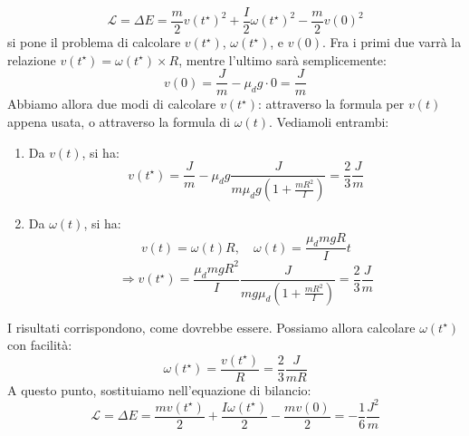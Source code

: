 \documentclass[a4paper,12pt]{article}
\begin{document}
\begin{itemize}
      $$ \mathcal{L} = \Delta E = \frac{m}{2}v(t^\star)^2 + \frac{I}{2}\omega(t^\star)^2 - \frac{m}{2}v(0)^2 $$
      si pone il problema di calcolare $v(t^\star)$, $\omega(t^\star)$, e $v(0)$. Fra i primi due varrà la relazione $v(t^\star) = \omega(t^\star) \times R$,
      mentre l'ultimo sarà semplicemente: 
      $$ v(0) = \frac{J}{m} - \mu_dg \cdot 0 = \frac{J}{m} $$
      Abbiamo allora due modi di calcolare $v(t^\star)$: attraverso la formula per $v(t)$ appena usata, o attraverso la formula di $\omega(t)$. Vediamoli entrambi:
      \begin{enumerate}
        \item Da $v(t)$, si ha:
          $$ v(t^\star) = \frac{J}{m} - \mu_dg \frac{J}{m\mu_dg\left( 1 + \frac{mR^2}{I} \right)} = \frac{2}{3}\frac{J}{m} $$
        \item Da $\omega(t)$, si ha:
          $$ v(t) = \omega(t)R, \quad \omega(t) = \frac{\mu_dmgR}{I}t $$
          $$ \Rightarrow v(t^\star) = \frac{\mu_dmgR^2}{I} \frac{J}{mg\mu_d\left( 1 + \frac{mR^2}{I} \right)} = \frac{2}{3}\frac{J}{m} $$
      \end{enumerate}
      I risultati corrispondono, come dovrebbe essere. Possiamo allora calcolare $\omega(t^\star)$ con facilità:
      $$ \omega(t^\star) = \frac{v(t^\star)}{R} = \frac{2}{3} \frac{J}{mR} $$
      A questo punto, sostituiamo nell'equazione di bilancio:
      $$ \mathcal{L} = \Delta E = \frac{mv(t^\star)}{2} + \frac{I\omega(t^\star)}{2} - \frac{mv(0)}{2} = -\frac{1}{6}\frac{J^2}{m} $$
\end{itemize}
\end{document}
